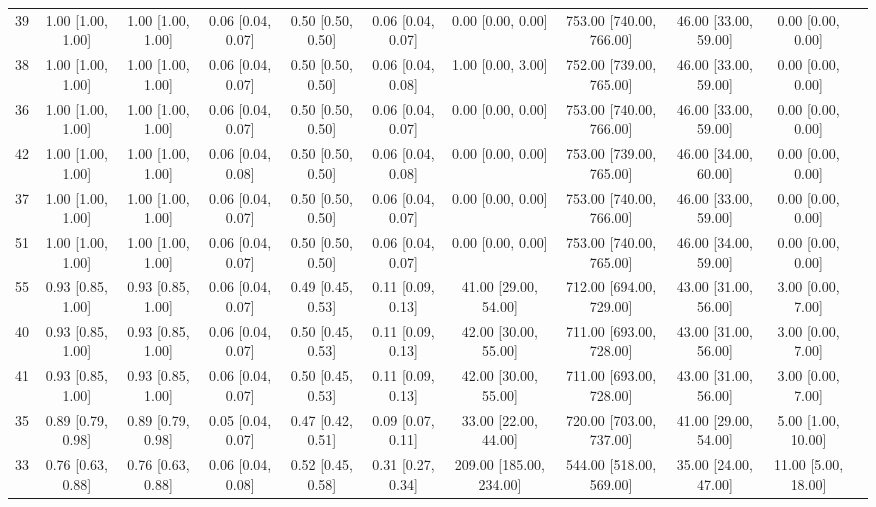 \documentclass[8pt]{article}
\begin{document}
\begin{center}
\begin{footnotesize}
\begin{longtable}{|ccccccccccc|}
 39 &  1.00 [1.00, 1.00] &  1.00 [1.00, 1.00] &  0.06 [0.04, 0.07] &  0.50 [0.50, 0.50] &  0.06 [0.04, 0.07] &        0.00 [0.00, 0.00] &  753.00 [740.00, 766.00] &  46.00 [33.00, 59.00] &     0.00 [0.00, 0.00] \\
 38 &  1.00 [1.00, 1.00] &  1.00 [1.00, 1.00] &  0.06 [0.04, 0.07] &  0.50 [0.50, 0.50] &  0.06 [0.04, 0.08] &        1.00 [0.00, 3.00] &  752.00 [739.00, 765.00] &  46.00 [33.00, 59.00] &     0.00 [0.00, 0.00] \\
 36 &  1.00 [1.00, 1.00] &  1.00 [1.00, 1.00] &  0.06 [0.04, 0.07] &  0.50 [0.50, 0.50] &  0.06 [0.04, 0.07] &        0.00 [0.00, 0.00] &  753.00 [740.00, 766.00] &  46.00 [33.00, 59.00] &     0.00 [0.00, 0.00] \\
 42 &  1.00 [1.00, 1.00] &  1.00 [1.00, 1.00] &  0.06 [0.04, 0.08] &  0.50 [0.50, 0.50] &  0.06 [0.04, 0.08] &        0.00 [0.00, 0.00] &  753.00 [739.00, 765.00] &  46.00 [34.00, 60.00] &     0.00 [0.00, 0.00] \\
 37 &  1.00 [1.00, 1.00] &  1.00 [1.00, 1.00] &  0.06 [0.04, 0.07] &  0.50 [0.50, 0.50] &  0.06 [0.04, 0.07] &        0.00 [0.00, 0.00] &  753.00 [740.00, 766.00] &  46.00 [33.00, 59.00] &     0.00 [0.00, 0.00] \\
 51 &  1.00 [1.00, 1.00] &  1.00 [1.00, 1.00] &  0.06 [0.04, 0.07] &  0.50 [0.50, 0.50] &  0.06 [0.04, 0.07] &        0.00 [0.00, 0.00] &  753.00 [740.00, 765.00] &  46.00 [34.00, 59.00] &     0.00 [0.00, 0.00] \\
 55 &  0.93 [0.85, 1.00] &  0.93 [0.85, 1.00] &  0.06 [0.04, 0.07] &  0.49 [0.45, 0.53] &  0.11 [0.09, 0.13] &     41.00 [29.00, 54.00] &  712.00 [694.00, 729.00] &  43.00 [31.00, 56.00] &     3.00 [0.00, 7.00] \\
 40 &  0.93 [0.85, 1.00] &  0.93 [0.85, 1.00] &  0.06 [0.04, 0.07] &  0.50 [0.45, 0.53] &  0.11 [0.09, 0.13] &     42.00 [30.00, 55.00] &  711.00 [693.00, 728.00] &  43.00 [31.00, 56.00] &     3.00 [0.00, 7.00] \\
 41 &  0.93 [0.85, 1.00] &  0.93 [0.85, 1.00] &  0.06 [0.04, 0.07] &  0.50 [0.45, 0.53] &  0.11 [0.09, 0.13] &     42.00 [30.00, 55.00] &  711.00 [693.00, 728.00] &  43.00 [31.00, 56.00] &     3.00 [0.00, 7.00] \\
 35 &  0.89 [0.79, 0.98] &  0.89 [0.79, 0.98] &  0.05 [0.04, 0.07] &  0.47 [0.42, 0.51] &  0.09 [0.07, 0.11] &     33.00 [22.00, 44.00] &  720.00 [703.00, 737.00] &  41.00 [29.00, 54.00] &    5.00 [1.00, 10.00] \\
 33 &  0.76 [0.63, 0.88] &  0.76 [0.63, 0.88] &  0.06 [0.04, 0.08] &  0.52 [0.45, 0.58] &  0.31 [0.27, 0.34] &  209.00 [185.00, 234.00] &  544.00 [518.00, 569.00] &  35.00 [24.00, 47.00] &   11.00 [5.00, 18.00] \\

\end{longtable}
\end{footnotesize}
\end{center}
\end{document}
